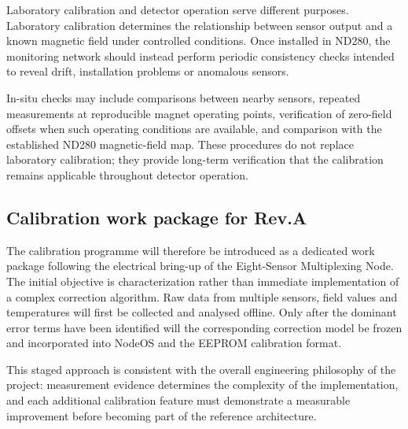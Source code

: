 Laboratory calibration and detector operation serve different purposes. Laboratory calibration determines the relationship between sensor output and a known magnetic field under controlled conditions. Once installed in ND280, the monitoring network should instead perform periodic consistency checks intended to reveal drift, installation problems or anomalous sensors.

In-situ checks may include comparisons between nearby sensors, repeated measurements at reproducible magnet operating points, verification of zero-field offsets when such operating conditions are available, and comparison with the established ND280 magnetic-field map. These procedures do not replace laboratory calibration; they provide long-term verification that the calibration remains applicable throughout detector operation.

\subsection{Calibration work package for Rev.A}

The calibration programme will therefore be introduced as a dedicated work package following the electrical bring-up of the Eight-Sensor Multiplexing Node. The initial objective is characterization rather than immediate implementation of a complex correction algorithm. Raw data from multiple sensors, field values and temperatures will first be collected and analysed offline. Only after the dominant error terms have been identified will the corresponding correction model be frozen and incorporated into NodeOS and the EEPROM calibration format.

This staged approach is consistent with the overall engineering philosophy of the project: measurement evidence determines the complexity of the implementation, and each additional calibration feature must demonstrate a measurable improvement before becoming part of the reference architecture.
